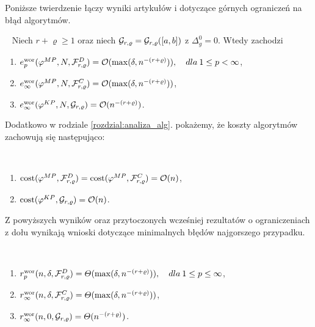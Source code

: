\documentclass[oik, pdftex, robocza, man]{mgrwms}
\begin{document}
    Poniższe twierdzenie łączy wyniki artykułów \cite{CoDF} i \cite{AoP} dotyczące górnych ograniczeń na błąd algorytmów.
    
    \begin{thm} \label{thm:1:ograniczenia_z_gory}~%
        Niech $r+\varrho \geq 1$ oraz niech $\mathcal{G}_{r,\varrho} = \mathcal{G}_{r,\varrho}([a,b])$ z $\Delta_{g}^{0} = 0$. Wtedy zachodzi
        \begin{enumerate}[label=(\roman*)]
            \item \label{thm:1:i}$e_{p}^{\mathrm{wor}}(\varphi^{MP},N,\mathcal{F}_{r,\varrho}^{D}) = \mathcal{O}(\max(\delta, n^{-(r+\varrho)})), \quad dla \: 1 \leq p < \infty$,
            \item \label{thm:1:ii}$e_{\infty}^{\mathrm{wor}}(\varphi^{MP},N,\mathcal{F}_{r,\varrho}^{C}) = \mathcal{O}(\max(\delta, n^{-(r+\varrho)}))$,
            \item \label{thm:1:iii}$e_{\infty}^{\mathrm{wor}}(\varphi^{KP},N,\mathcal{G}_{r,\varrho}) = \mathcal{O}(n^{-(r+\varrho)})$.
        \end{enumerate}
    \end{thm}

    Dodatkowo w rodziale \ref{rozdzial:analiza_alg}. pokażemy, że koszty algorytmów zachowują się następująco:

    \begin{stw}~%
        \begin{enumerate}
            \item $\mathrm{cost}(\varphi^{MP}, \mathcal{F}_{r,\varrho}^{D}) = \mathrm{cost}(\varphi^{MP}, \mathcal{F}_{r,\varrho}^{C}) = \mathcal{O}(n)$,
            \item $\mathrm{cost}(\varphi^{KP}, \mathcal{G}_{r,\varrho}) = \mathcal{O}(n)$.
        \end{enumerate}
    \end{stw}

    Z powyższych wyników oraz przytoczonych wcześniej rezultatów o ograniczeniach z dołu wynikają wnioski dotyczące minimalnych błędów najgorszego przypadku.

    \begin{cor}~
        \begin{enumerate}[label=(\roman*)]
            \item $r^{\mathrm{wor}}_{p}(n, \delta, \mathcal{F}^{D}_{r,\varrho}) = \varTheta(\max(\delta, n^{-(r+\varrho)})), \quad dla \: 1 \leq p \leq \infty$,
            \item $r^{\mathrm{wor}}_{\infty}(n, \delta, \mathcal{F}^{C}_{r,\varrho}) = \varTheta(\max(\delta, n^{-(r+\varrho)}))$,
            \item $r^{\mathrm{wor}}_{\infty}(n, 0, \mathcal{G}_{r,\varrho}) = \varTheta(n^{-(r+\varrho)})$.
        \end{enumerate}
    \end{cor}
    
\end{document}
